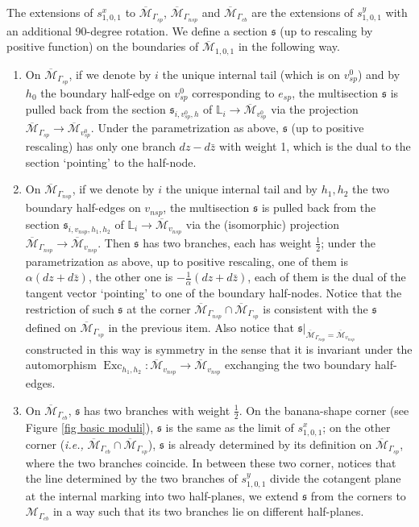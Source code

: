 \documentclass[11pt]{amsart}
\theoremstyle{definition}
\theoremstyle{remark}
\newcommand{\<}{\left<}
\renewcommand{\>}{\right>}
\numberwithin{equation}{section}
\def\Mbar{{\overline{\mathcal M}}}
\begin{document}
The extensions of $s^x_{1,0,1}$ to $\Mbar_{\Gamma_{sp}}$, $\Mbar_{\Gamma_{nsp}}$ and $\Mbar_{\Gamma_{cb}}$ are the extensions of $s^y_{1,0,1}$ with an additional 90-degree rotation. We define a section $\mathfrak{s}$ (up to rescaling by positive function) on the boundaries of $\Mbar_{1,0,1}$  in the following way.
\begin{enumerate}
    \item On $\Mbar_{\Gamma_{sp}}$, if we denote by $i$ the unique internal tail (which is on $v^0_{sp}$) and by $h_0$ the boundary half-edge on $v^0_{sp}$ corresponding to $e_{sp}$, the multisection $\mathfrak s$ is pulled back from the section $\mathfrak s_{i,v^0_{sp},h}$ of $\mathbb L_i\to \Mbar_{v^0_{sp}}$ via the projection $\Mbar_{\Gamma_{sp}}\to \Mbar_{v^0_{sp}}$. Under the parametrization as above, $\mathfrak{s}$ (up to positive rescaling) has  only one branch $dz-d\bar z$ with weight 1, which is the dual to the section `pointing' to the half-node. 
    
    
    \item On $\Mbar_{\Gamma_{nsp}}$, if we denote by $i$ the unique internal tail and by $h_1,h_2$ the two boundary half-edges on $v_{nsp}$, the multisection $\mathfrak s$ is pulled back from the section $\mathfrak s_{i,v_{nsp},h_1,h_2}$ of $\mathbb L_i\to \Mbar_{v_{nsp}}$ via the (isomorphic) projection $\Mbar_{\Gamma_{nsp}}\to \Mbar_{v_{nsp}}$. Then $\mathfrak{s}$ has two branches, each has weight $\frac{1}{2}$; under the parametrization as above, up to positive rescaling, one of them is $\alpha (dz+d\bar{z})$, the other one is $-\frac{1}{\alpha}(dz+d\bar{z})$, each of them is the dual of the tangent vector `pointing' to one of the boundary half-nodes.
    Notice that the restriction of such $\mathfrak s$ at the corner $\Mbar_{\Gamma_{nsp}}\cap \Mbar_{\Gamma_{sp}}$ is consistent with the $\mathfrak s$ defined on $\Mbar_{\Gamma_{sp}}$ in the previous item. Also notice that $\mathfrak s\vert_{\Mbar_{\Gamma_{nsp}}=\Mbar_{v_{nsp}}}$ constructed in this way is symmetry in the sense that it is invariant under the automorphism $\operatorname{Exc}_{h_1,h_2}\colon\Mbar_{v_{nsp}}\to\Mbar_{v_{nsp}} $ exchanging the two boundary half-edges.
    
    \item On $\Mbar_{\Gamma_{cb}}$, $\mathfrak{s}$ has two branches with weight $\frac{1}{2}$. On the banana-shape corner (see Figure \ref{fig basic moduli}), $\mathfrak{s}$ is the same as the limit of $s^x_{1,0,1}$; on the other corner (\textit{i.e.,} $\Mbar_{\Gamma_{cb}}\cap \Mbar_{\Gamma_{sp}}$), $\mathfrak s$ is already determined by its definition on $\Mbar_{\Gamma_{sp}}$, where the two branches coincide. In between these two corner, notices that the line determined by the two branches of $s^y_{1,0,1}$ divide the cotangent plane at the internal marking into two half-planes, we extend $\mathfrak s$ from the corners to $\mathcal M_{\Gamma_{cb}}$ in a way such that its two branches lie on different half-planes.


   
    
\end{enumerate}
\end{document}
